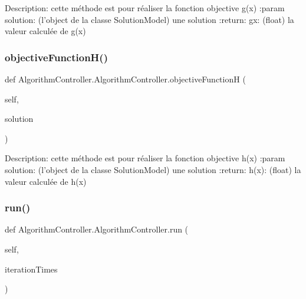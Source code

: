 \begin{DoxyVerb}Description: cette méthode est pour réaliser la fonction objective g(x)
:param solution: (l'object de la classe SolutionModel) une solution
:return: gx: (float) la valeur calculée de g(x)
\end{DoxyVerb}
 \mbox{\label{class_algorithm_controller_1_1_algorithm_controller_abe539c495b1f651be7198f43c7640ce0}} 
\subsubsection{\texorpdfstring{objective\+Function\+H()}{objectiveFunctionH()}}
{\footnotesize\ttfamily def Algorithm\+Controller.\+Algorithm\+Controller.\+objective\+FunctionH (\begin{DoxyParamCaption}\item[{}]{self,  }\item[{}]{solution }\end{DoxyParamCaption})}

\begin{DoxyVerb}Description: cette méthode est pour réaliser la fonction objective h(x)
:param solution: (l'object de la classe SolutionModel) une solution
:return: h(x): (float) la valeur calculée de h(x)
\end{DoxyVerb}
 \mbox{\label{class_algorithm_controller_1_1_algorithm_controller_a16c94d71907fe272accefc3b11d202ef}} 
\subsubsection{\texorpdfstring{run()}{run()}}
{\footnotesize\ttfamily def Algorithm\+Controller.\+Algorithm\+Controller.\+run (\begin{DoxyParamCaption}\item[{}]{self,  }\item[{}]{iteration\+Times }\end{DoxyParamCaption})}

